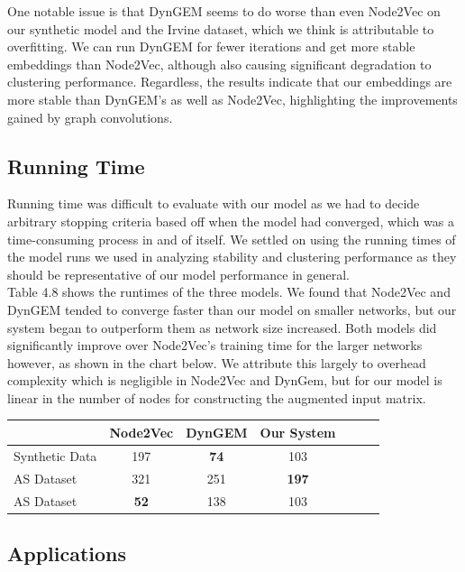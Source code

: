 \documentclass[12pt,twoside]{report}
\begin{document}
One notable issue is that DynGEM seems to do worse than even Node2Vec on our synthetic model and the  Irvine dataset, which we think is attributable to overfitting. We can run DynGEM for fewer iterations and get more stable embeddings than Node2Vec, although also causing significant degradation to clustering performance. Regardless, the results indicate that our embeddings are more stable than DynGEM's as well as Node2Vec, highlighting the improvements gained by graph convolutions. \\

\subsection{Running Time}

Running time was difficult to evaluate with our model as we had to decide arbitrary stopping criteria based off when the model had converged, which was a time-consuming process in and of itself. We settled on using the running times of the model runs we used in analyzing stability and clustering performance as they should be representative of our model performance in general. \\

Table 4.8 shows the runtimes of the three models. We found that Node2Vec and DynGEM tended to converge faster than our model on smaller networks, but our system began to outperform them as network size increased. Both models did significantly improve over Node2Vec's training time for the larger networks however, as shown in the chart below. We attribute this largely to overhead complexity which is negligible in Node2Vec and DynGem, but for our model is linear in the number of nodes for constructing the augmented input matrix. \\

\begin{center}
\begin{tabular}{l*{5}{c}r}
              & Node2Vec & DynGEM & Our System \\
\hline
Synthetic Data    & 197 & \textbf{74} & 103  \\
AS Dataset   & 321 & 251 & \textbf{197}  \\
AS Dataset   & \textbf{52} & 138 & 103  \\
\end{tabular}
\end{center} 

\subsection{Applications}
\end{document}
